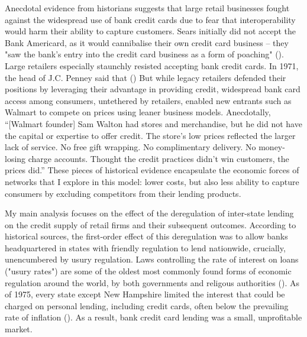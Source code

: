 \documentclass[12pt,english]{article}
\begin{document}
Anecdotal evidence from historians suggests that large retail businesses fought against the widespread use of bank credit cards due to fear that interoperability would harm their ability to capture customers. Sears initially did not accept the Bank Americard, as it would cannibalise their own credit card business -- they "saw the bank's entry into the credit card business as a form of poaching" (\cite{nocera_piece_2013}). Large retailers especially staunchly resisted accepting bank credit cards. In 1971, the head of J.C. Penney said that  (\cite{hyman_borrow_2012}) But while legacy retailers defended their positions by leveraging their advantage in providing credit, widespread bank card access among consumers, untethered by retailers, enabled new entrants such as Walmart to compete on prices using leaner business models. Anecdotally, ``[Walmart founder] Sam  Walton had stores and merchandise, but he did not have the capital or expertise to offer credit. The store's low prices reflected the larger lack of service. No free gift wrapping. No complimentary delivery. No money-losing charge accounts. Thought the credit practices didn't win customers, the prices did.'' \cite{hyman_debtor_2012} These pieces of historical evidence encapsulate the economic forces of networks that I explore in this model: lower costs, but also less ability to capture consumers by excluding competitors from their lending products.

My main analysis focuses on the effect of the deregulation of inter-state lending on the credit supply of retail firms and their subsequent outcomes. According to historical sources, the first-order effect of this deregulation was to allow banks headquartered in states with friendly regulation to lend nationwide, crucially, unencumbered by usury regulation. Laws controlling the rate of interest on loans ("usury rates") are some of the oldest most commonly found forms of economic regulation around the world, by both governments and religous authorities (\cite{glaeser_neither_1998}). As of 1975, every state except New Hampshire limited the interest that could be charged on personal lending, including credit cards, often below the prevailing rate of inflation (\cite{walter_cost_1998}). As a result, bank credit card lending was a small, unprofitable market. 
\end{document}

